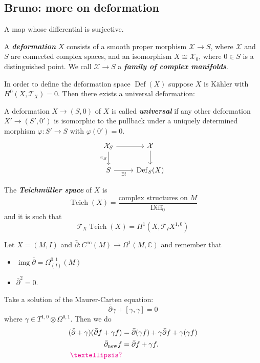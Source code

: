 \documentclass{article}
\numberwithin{equation}{section}
\newcommand{\C}{\mathbb{C}}
\newcommand{\Tc}{\mathcal{T}}
\newcommand{\Xc}{\mathcal{X}}
\DeclareMathOperator{\img}{img}
\DeclareMathOperator{\Def}{Def}
\DeclareMathOperator{\Teich}{Teich}
\DeclareMathOperator{\Diff}{Diff}
\renewcommand{\Def}{\operatorname{Def}}
\begin{document}
\subsection{Bruno: more on deformation}
\begin{defn} A map whose differential is surjective.
\end{defn}
\begin{defn}
	A \textbf{\textit{deformation}} $X$ consists of a smooth proper morphism $\Xc \to S$, where $\Xc$ and $S$ are connected complex spaces, and an isomorphism $X \cong \Xc_0$, where $0\in S$ is a distinguished point. We call $\Xc\to S$ a \textbf{\textit{family of complex manifolds}}.
\end{defn}

In order to define the deformation space $\Def(X)$ suppose $X$ is Kähler with $H^0(X,\Tc_X)=0$. Then there exists a universal deformation:
\begin{defn}
	A deformation $X\to(S,0)$ of $X$ is called \textbf{\textit{universal}} if any other deformation $X' \to (S',0')$ is isomorphic to the pullback under a uniquely determined morphism $\varphi:S'\to S$ with $\varphi(0')=0$.
	\[\begin{tikzcd}
		\Xc_S\arrow[d,"\pi_S",swap]\arrow[r]&\Xc\arrow[d]\\
		S\arrow[r,"\exists!",swap]&\Def_S(X)
	\end{tikzcd}\]
\end{defn}
\begin{defn}
	The \textbf{\textit{Teichmüller space}} of $X$ is
	\[\Teich(X)=\frac{\text{complex structures on }M}{\Diff_0}\]
	and it is such that
	\[\Tc_X\Teich(X)=H^1(X,\Tc_IX^{1,0})\]
\end{defn}
\begin{remark}
	Let $X=(M,I)$ and $\bar\partial:C^\infty(M)\to\Omega^1(M,\C)$ and remember that
	\begin{itemize}
		\item $\img\bar\partial=\Omega^{0,1}_{(I)}(M)$
		\item $\bar\partial^2=0$.
	\end{itemize}
	Take a solution of the Maurer-Carten equation:
	\[\bar\partial\gamma+[\gamma,\gamma]=0\]
	where $\gamma\in T^{1,0}\otimes\Omega^{0,1}$. Then we do
	\begin{align*}
		(\bar\partial+\gamma)(\bar\partial f+\gamma f)&=\bar\partial(\gamma f)+\gamma\bar\partial f+\gamma(\gamma f)\\
		\bar\partial_{\text{new}}f&=\bar\partial f+\gamma f.\\
		{\color{magenta}…?}
	\end{align*}
\end{remark}
\end{document}
